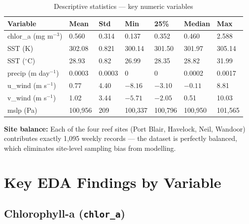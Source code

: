 \documentclass[12pt,a4paper]{report}
\begin{document}
\begin{table}[H]
\centering
\caption{Descriptive statistics — key numeric variables}
\begin{tabular}{L{4.2cm}R{1.5cm}R{1.5cm}R{1.5cm}R{1.5cm}R{1.5cm}R{1.5cm}}
\toprule
\textbf{Variable} & \textbf{Mean} & \textbf{Std} & \textbf{Min} & \textbf{25\%} & \textbf{Median} & \textbf{Max} \\
\midrule
{}
chlor\_a (mg m$^{-3}$) & 0.560 & 0.314 & 0.137 & 0.352 & 0.460 & 2.588 \\
SST (K) & 302.08 & 0.821 & 300.14 & 301.50 & 301.97 & 305.14 \\
SST ($^\circ$C) & 28.93 & 0.82 & 26.99 & 28.35 & 28.82 & 31.99 \\
precip (m day$^{-1}$) & 0.0003 & 0.0003 & 0 & 0 & 0.0002 & 0.0017 \\
u\_wind (m s$^{-1}$) & 0.77 & 4.40 & $-8.16$ & $-3.10$ & $-0.11$ & 8.81 \\
v\_wind (m s$^{-1}$) & 1.02 & 3.44 & $-5.71$ & $-2.05$ & 0.51 & 10.03 \\
mslp (Pa) & 100,956 & 209 & 100,337 & 100,796 & 100,950 & 101,565 \\
\bottomrule
\end{tabular}
\label{tab:stats}
\end{table}

\textbf{Site balance:} Each of the four reef sites (Port Blair, Havelock, Neil, Wandoor)
contributes exactly 1,095 weekly records — the dataset is perfectly balanced, which
eliminates site-level sampling bias from modelling.

\section{Key EDA Findings by Variable}

\subsection{Chlorophyll-a (\texttt{chlor\_a})}
\end{document}
